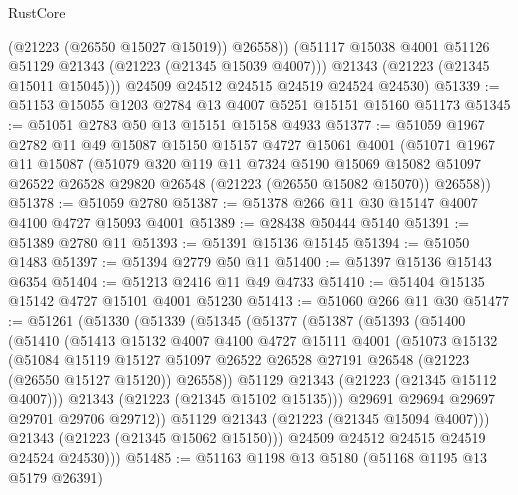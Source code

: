 \begin{lexlean}{RustCore}
\begin{coremodule}
            (@21223 (@26550 @15027 @15019))
            @26558))
        (@51117 @15038 @4001 @51126 @51129 @21343 (@21223 (@21345 @15039 @4007)))
        @21343
        (@21223 (@21345 @15011 @15045)))
      @24509
      @24512
      @24515
      @24519
      @24524
      @24530)
@51339 := @51153 @15055 @1203 @2784 @13 @4007 @5251 @15151 @15160 @51173
@51345 := @51051 @2783 @50 @13 @15151 @15158 @4933
@51377 := @51059
    @1967
    @2782
    @11
    @49
    @15087
    @15150
    @15157
    @4727
    @15061
    @4001
    (@51071
      @1967
      @11
      @15087
      (@51079
        @320
        @119
        @11
        @7324
        @5190
        @15069
        @15082
        @51097
        @26522
        @26528
        @29820
        @26548
        (@21223 (@26550 @15082 @15070))
        @26558))
@51378 := @51059 @2780
@51387 := @51378 @266 @11 @30 @15147 @4007 @4100 @4727 @15093 @4001
@51389 := @28438 @50444 @5140
@51391 := @51389 @2780 @11
@51393 := @51391 @15136 @15145
@51394 := @51050 @1483
@51397 := @51394 @2779 @50 @11
@51400 := @51397 @15136 @15143 @6354
@51404 := @51213 @2416 @11 @49 @4733
@51410 := @51404 @15135 @15142 @4727 @15101 @4001 @51230
@51413 := @51060 @266 @11 @30
@51477 := @51261
    (@51330
      (@51339
        (@51345
          (@51377
            (@51387
              (@51393
                (@51400
                  (@51410
                    (@51413
                      @15132
                      @4007
                      @4100
                      @4727
                      @15111
                      @4001
                      (@51073
                        @15132
                        (@51084
                          @15119
                          @15127
                          @51097
                          @26522
                          @26528
                          @27191
                          @26548
                          (@21223 (@26550 @15127 @15120))
                          @26558))
                      @51129
                      @21343
                      (@21223 (@21345 @15112 @4007)))
                    @21343
                    (@21223 (@21345 @15102 @15135)))
                  @29691
                  @29694
                  @29697
                  @29701
                  @29706
                  @29712))
              @51129
              @21343
              (@21223 (@21345 @15094 @4007)))
            @21343
            (@21223 (@21345 @15062 @15150)))
          @24509
          @24512
          @24515
          @24519
          @24524
          @24530)))
@51485 := @51163 @1198 @13 @5180 (@51168 @1195 @13 @5179 @26391)

\end{coremodule}
\end{lexlean}
